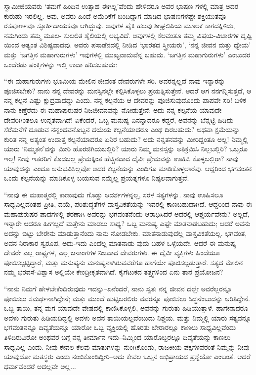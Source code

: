 ಸ್ವಾಮೀಜಿಯವರು ‘ತಮಗೆ ಹಿಂದಿನ ಉತ್ಸಾಹ ಈಗಿಲ್ಲ’ವೆಂದು ಹೇಳಿದರೂ ಅವರ ಭಾಷಣ ಗಳಲ್ಲಿ ಮಾತ್ರ ಅದರ ಕುರುಹು ಇರಲಿಲ್ಲ. ಅವು, ಅವರು ಹಿಂದೆ ಅಮೆರಿಕೆಗೆ ಬಂದಿದ್ದಾಗ ಮಾಡಿದ ಭಾಷಣಗಳಷ್ಟೇ ಶಕ್ತಿಯುತವೂ ರಸಪೂರ್ಣವೂ ಸ್ಫೂರ್ತಿದಾಯಕವೂ ಆಗಿದ್ದುವು. ಅವುಗಳ ಪೈಕಿ ಹಲವು ಶೀಘ್ರಲಿಪಿಯ ಮೂಲಕ ಕಾಗದಕ್ಕಿಳಿದು, ನಮಗಿಂದು ತಮ್ಮ ಮೂಲ- ಸುಲಲಿತ ಶೈಲಿಯಲ್ಲಿ ಲಭ್ಯವಿದೆ. ಅವುಗಳಲ್ಲಿ ಕೆಲವಂತೂ ತಮ್ಮ ವಿಷಯ-ವಿಚಾರಗಳ ದೃಷ್ಟಿ ಯಿಂದ ಅತ್ಯಂತ ವಿಶಿಷ್ಟವಾದವು. ಅವರು ಪಸಾಡೆನದಲ್ಲಿ ನೀಡಿದ ‘ಭಾರತದ ಸ್ತ್ರೀಯರು’, ‘ನನ್ನ ಜೀವನ ಮತ್ತು ಧ್ಯೇಯ’ ಮತ್ತು ‘ಜಗತ್ತಿನ ಮಹಾಗುರುಗಳು’ ಇವುಗಳಲ್ಲಿ ಮುಖ್ಯವಾದುವೆನ್ನ ಬಹುದು. ‘ಜಗತ್ತಿನ ಮಹಾಗುರುಗಳು’ ಎಂಬುದರ ಒಂದೆರಡು ಪಂಕ್ತಿಗಳನ್ನು ಇಲ್ಲಿ ಉದಾ ಹರಿಸಬಹುದು:

“ಈ ಮಹಾಗುರುಗಳು ಭೂಮಿಯ ಮೇಲಿನ ಜೀವಂತ ದೇವರುಗಳೇ ಸರಿ. ಅವರನ್ನಲ್ಲದೆ ನಾವು ಇನ್ನಾರನ್ನು ಪೂಜಿಸಬೇಕು? ನಾನು ನನ್ನ ದೇವರನ್ನು ಮನಸ್ಸಿನಲ್ಲೇ ಕಲ್ಪಿಸಿಕೊಳ್ಳಲು ಪ್ರಯತ್ನಿಸುತ್ತೇನೆ. ಆದರೆ ಆಗ ನನಗನ್ನಿಸುತ್ತದೆ, ಆ ನನ್ನ ಕಲ್ಪನೆ ಎಷ್ಟು ಕ್ಷುದ್ರವಾದದ್ದು ಎಂದು. ನನ್ನ ಕಲ್ಪನೆಯ ಆ ದೇವರನ್ನು ಪೂಜಿಸುವುದೊಂದು ಪಾಪವೇ ಸರಿ! ಬಳಿಕ ನಾನು ಕಣ್ತೆರೆದು ಈ ಮಹಾಪುರುಷರ ನಿಜಜೀವನವನ್ನು ನೋಡುತ್ತೇನೆ; ಅದು ನನ್ನ ಕಲ್ಪನೆಯ ಯಾವುದೇ ದೇವರಿಗಿಂತಲೂ ಉನ್ನತವಾಗಿದೆ! ಏಕೆಂದರೆ, ಒಬ್ಬ ಮನುಷ್ಯ ಏನನ್ನಾದರೂ ಕದ್ದರೆ, ಅವನನ್ನು ಬೆನ್ನಟ್ಟಿ ಹಿಡಿದು ಸೆರೆಮನೆಗೆ ದೂಡುವ ನನ್ನಂಥವನೊಬ್ಬನ ದಯೆಯ ಕಲ್ಪನೆಯಾದರೂ ಎಂಥ ದಿರಬಹುದು? ಅಥವಾ ಕ್ಷಮೆಯನ್ನು ಕುರಿತ ನನ್ನ ಅತ್ಯಂತ ಉದಾತ್ತ ಕಲ್ಪನೆಯಾದರೂ ಏನಿರ ಬಹುದು? ಅದು ನನ್ನತನವನ್ನು ಮೀರಿದ್ದಂತೂ ಅಲ್ಲ! ನಿಮ್ಮಲ್ಲಿ ಯಾರು ‘ನಿಮ್ಮತನ’ವನ್ನು ಮೀರಿ ಹೊರಜಿಗಿಯಬಲ್ಲಿರಿ? ಯಾರು ನಿಮ್ಮ ಮನಸ್ಸನ್ನು ಅತಿಕ್ರಮಿಸಿ ನಿಲ್ಲಬಲ್ಲಿರಿ? ಒಬ್ಬರೂ ಇಲ್ಲ! ನೀವು ಇತರರಿಗೆ ಕೊಡಬಲ್ಲ ಪ್ರೇಮಕ್ಕಿಂತ ಹೆಚ್ಚಿನದಾದ ದೈವೀ ಪ್ರೇಮವನ್ನು ಊಹಿಸಿ ಕೊಳ್ಳಬಲ್ಲಿರಾ? ನಾವು ಯಾವುದನ್ನು ಎಂದೂ ಅನುಭವಿಸಿಲ್ಲವೋ ಅದರ ಕಲ್ಪನೆಯನ್ನು ಎಂದಿಗೂ ಮಾಡಿಕೊಳ್ಳಲಾರೆವು. ಆದ್ದರಿಂದ ಭಗವಂತನ ಒಂದು ಕಲ್ಪನೆಯನ್ನು ಮಾಡಿಕೊಳ್ಳ ಬಯಸುವ ನಮ್ಮೆಲ್ಲ ಪ್ರಯತ್ನಗಳೂ ನಿಷ್ಫಲವಾಗುತ್ತವೆ.

“ನಾವು ಈ ಮಹಾತ್ಮರಲ್ಲಿ ಕಾಣುವುದು ಗೊಡ್ಡು ಆದರ್ಶಗಳನ್ನಲ್ಲ, ಸರಳ ಸತ್ಯಗಳನ್ನು. ನಾವು ಊಹಿಸಲೂ ಸಾಧ್ಯವಿಲ್ಲದಂತಹ ಪ್ರೀತಿ, ದಯೆ, ಪರಿಶುದ್ಧತೆಗಳ ವಾಸ್ತವಿಕತೆಯನ್ನು ಇವರಲ್ಲಿ ಕಾಣಬಹುದಾಗಿದೆ. ಆದ್ದರಿಂದ ನಾವು ಈ ಮಹಾಪುರುಷರ ಪಾದಗಳಲ್ಲಿ ಶರಣಾಗಿ ಅವರನ್ನು ಭಗವಂತನೆಂದು ಆರಾಧಿಸಿದರೆ ಅದರಲ್ಲಿ ಆಶ್ಚರ್ಯವೇನು? ಅಲ್ಲದೆ, ಇನ್ನಾರೇ ಆದರೂ ಹೀಗಲ್ಲದೆ ಮತ್ತೇನು ಮಾಡಲು ಸಾಧ್ಯ? ಒಬ್ಬ ಮನುಷ್ಯ ಎಷ್ಟೇ ಮಾತನಾಡಬಹುದು; ಆದರೆ ಅವನು ಅದನ್ನು ಬಿಟ್ಟು ಬೇರೇನು ಮಾಡುತ್ತಾನೆಂದು ನಾನು ನೋಡಬೇಕು. ಮಾತನಾಡುವುದೆಲ್ಲ ವಾಸ್ತವಿಕತೆಯಲ್ಲ. ಭಗವಂತ, ಅವನ ನಿರಾಕಾರ ಸ್ವರೂಪ, ಅದು-ಇದು ಎಂದೆಲ್ಲ ಮಾತನಾಡು ವುದು ಬಹಳ ಒಳ್ಳೆಯದೇ. ಆದರೆ ಈ ಮನುಷ್ಯ ದೇವರೇ ಎಲ್ಲ ರಾಷ್ಟ್ರಗಳ, ಎಲ್ಲ ಜನಾಂಗಗಳ ನಿಜವಾದ ದೇವರುಗಳು. ಈ ದೈವೀ ವ್ಯಕ್ತಿಗಳು ಹಿಂದೆಯೂ ಪೂಜಿಸಲ್ಪಟ್ಟಿದ್ದಾರೆ, ಮತ್ತು ಮನುಷ್ಯನು ಮನುಷ್ಯನಾಗಿರುವವರೆಗೂ ಹಾಗೆಯೇ ಪೂಜಿಸಲ್ಪಡುತ್ತಾರೆ. ಸತ್ಯದ ಮೇಲಿನ ನಮ್ಮ ಭರವಸೆ-ವಿಶ್ವಾಸ ಅಲ್ಲಿಯೇ ಕೇಂದ್ರೀಕೃತವಾಗಿದೆ. ಕೈಗೆಟುಕದ ತತ್ತ್ವಗಳಿಂದ ಏನು ತಾನೆ ಪ್ರಯೋಜನ?

“ನಾನು ನಿಮಗೆ ಹೇಳಬೇಕೆಂದಿರುವುದು ಇದನ್ನು–ಏನೆಂದರೆ, ನಾನು ಸ್ವತಃ ನನ್ನ ಜೀವನ ದಲ್ಲೇ ಅವರೆಲ್ಲರನ್ನೂ ಪೂಜಿಸಲು ಸಮರ್ಥನಾಗಿದ್ದೇನೆ; ಮತ್ತು ಮುಂದೆ ಹುಟ್ಟಿಬರಲಿರು ವವರನ್ನೂ ಪೂಜಿಸಲು ಸಿದ್ಧನೆಂಬುದನ್ನು ಅರಿತಿದ್ದೇನೆ. ಒಬ್ಬ ತಾಯಿ, ತನ್ನ ಮಗ ಯಾವುದೇ ವೇಷದಲ್ಲಿ ಕಾಣಿಸಿಕೊಳ್ಳಲಿ, ಅವನನ್ನು ಗುರುತು ಹಿಡಿಯುತ್ತಾಳೆ. ಹಾಗೇನಾದರೂ ಅವಳು ಗುರುತು ಹಿಡಿಯದಿದ್ದಲ್ಲಿ ಅವಳು ಅವನ ತಾಯಿಯಲ್ಲವೆಂಬುದು ನಿಶ್ಚಯ. ಮತ್ತು ನಿಮ್ಮಲ್ಲಿ ಯಾರು ಸತ್ಯವನ್ನೂ ಭಗವಂತನನ್ನೂ ದಿವ್ಯತೆಯನ್ನೂ ಯಾರೋ ಒಬ್ಬ ವ್ಯಕ್ತಿಯಲ್ಲಿ ಹೊರತು ಬೇರಾರಲ್ಲೂ ಕಾಣಲು ಸಾಧ್ಯವಿಲ್ಲವೆಂದು ತಿಳಿದಿರುವಿರೋ ಅಂಥವರ ಬಗ್ಗೆ ನನ್ನ ತೀರ್ಮಾನ ಇದು–ನಿಮ್ಮಿಂದ ಯಾರೊಬ್ಬರಲ್ಲೂ ದಿವ್ಯತೆಯನ್ನು ಕಾಣಲು ಸಾಧ್ಯವಿಲ್ಲ ಎಂದು. ನೀವು ಕೇವಲ ಕೆಲವು ಮಾತುಗಳನ್ನು ನುಂಗಿಕೊಂಡು, ರಾಜಕೀಯ ಪಕ್ಷಗಳವರಂತೆ ನಿಮ್ಮನ್ನು ನೀವು ಯಾವುದೋ ಮತಸ್ಥರು ಎಂದು ನಂಬಿಕೊಂಡಿದ್ದೀರಿ–ಅದು ಕೇವಲ ಒಬ್ಬನ ಅಭಿಪ್ರಾಯದ ಪ್ರಶ್ನೆಯೋ ಎಂಬಂತೆ. ಆದರೆ ಧರ್ಮವೆಂದರೆ ಅದಲ್ಲವೇ ಅಲ್ಲ...


